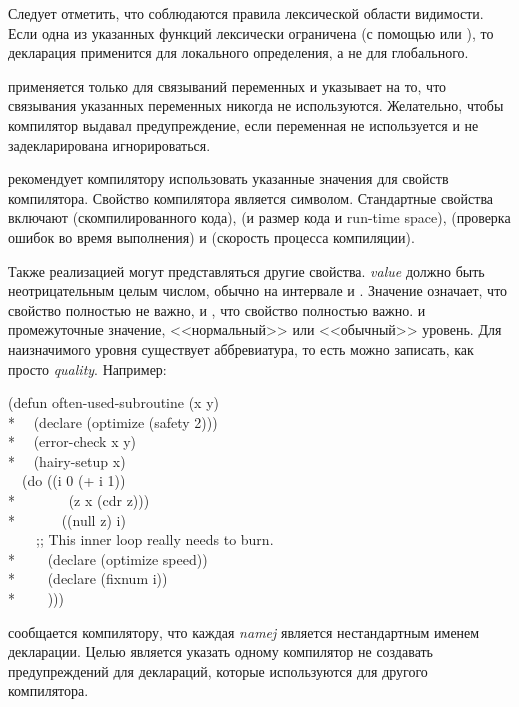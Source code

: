 \begin{flushdesc}
Следует отметить, что соблюдаются правила лексической области видимости. Если
одна из указанных функций лексически ограничена (с помощью  или
), то декларация применится для локального определения, а не для
глобального.

\item[\cdf{ignore}]
 применяется только для
связываний переменных и указывает на то, что связывания указанных переменных
никогда не используются. Желательно, чтобы компилятор выдавал предупреждение, если
переменная не используется и не задекларирована игнорироваться.

\item[\cdf{optimize}]
рекомендует компилятору использовать указанные значения для свойств компилятора.
Свойство компилятора является символом. Стандартные свойства включают 
 (скомпилированного кода),  (и размер кода и run-time
space),  (проверка ошибок во время выполнения) и
 (скорость процесса компиляции).

Также реализацией могут представляться другие свойства. \emph{value} должно быть
неотрицательным целым числом, обычно на интервале  и . Значение
 означает, что свойство полностью не важно, и , что свойство
полностью важно.
 и  промежуточные значение,  <<нормальный>> или <<обычный>>
уровень.
Для наизначимого уровня существует аббревиатура, то есть 
можно записать, как просто \emph{quality}.
Например:
\begin{lisp}
(defun often-used-subroutine (x y) \\*
~~(declare (optimize (safety 2))) \\*
~~(error-check x y) \\*
~~(hairy-setup x) \\
~~(do ((i 0 (+ i 1)) \\*
~~~~~~~(z x (cdr z))) \\*
~~~~~~((null z) i) \\
~~~~;; This inner loop really needs to burn. \\*
~~~~(declare (optimize speed)) \\*
~~~~(declare (fixnum i)) \\*
~~~~)))
\end{lisp}

\item[\cdf{declaration}]
 сообщается компилятору, что
каждая \emph{namej} является нестандартным именем декларации.
Целью является указать одному компилятор не создавать предупреждений для
деклараций, которые используются для другого компилятора.
\end{flushdesc}


